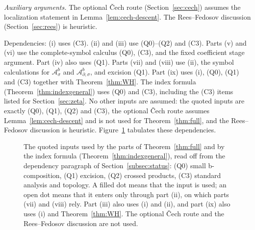 \documentclass[11pt,oneside,reqno]{article}
\newcommand{\Z}{\mathbb Z}
\newcommand{\Ib}{\mathcal I^b}
\newcommand{\Idb}{\mathcal I^b_\partial}
\newcommand{\Isb}{\mathcal I^b_\sigma}
\newcommand{\Ab}{\mathcal A^b}
\newcommand{\Asb}{\mathcal A^b_\sigma}
\newcommand{\Adb}{\mathcal A^b_\partial}
\newcommand{\Adsb}{\mathcal A^b_{\partial,\sigma}}
\theoremstyle{plain}
\theoremstyle{definition}
\theoremstyle{remark}
\begin{document}
\emph{Auxiliary arguments.} The optional \v Cech route
(Section~\ref{sec:cech}) assumes the localization statement in
Lemma~\ref{lem:cech-descent}. The Rees--Fedosov discussion
(Section~\ref{sec:rees}) is heuristic.

Dependencies: (i) uses (C3). (ii) and (iii) use (Q0)--(Q2) and (C3).
Parts (v) and (vi) use the complete-symbol calculus (Q0), (C3), and
the fixed coefficient stage argument. Part (iv) also uses (Q1).
Parts (vii) and (viii) use (ii), the symbol calculations for
\(\Asb\) and \(\Adsb\), and excision (Q1).
Part (ix) uses (i), (Q0), (Q1) and (C3) together with
Theorem~\ref{thm:WH}. The index formula
(Theorem~\ref{thm:indexgeneral}) uses (Q0) and (C3), including the (C3)
items listed for Section~\ref{sec:zeta}. No other inputs are assumed: the
quoted inputs are exactly (Q0), (Q1), (Q2) and (C3), the optional \v Cech
route assumes Lemma~\ref{lem:cech-descent} and is not used for
Theorem~\ref{thm:full}, and the Rees--Fedosov discussion is heuristic.
Figure~\ref{fig:inputs} tabulates these dependencies.

\begin{figure}[tbp]
\centering
{}
\caption[Quoted inputs used by each result]{The quoted inputs used by the
parts of Theorem~\ref{thm:full} and by the index formula
(Theorem~\ref{thm:indexgeneral}), read off from the dependency paragraph
of Section~\ref{subsec:status}: (Q0) small b-composition, (Q1) excision, (Q2) crossed products,
(C3) standard analysis and topology. A filled dot means that the input is
used; an open dot means that it
enters only through part (ii), on which parts (vii) and (viii) rely. Part
(iii) also uses (i) and (ii), and part (ix) also uses (i) and
Theorem~\ref{thm:WH}. The optional \v Cech route and the Rees--Fedosov
discussion are not used.}
\label{fig:inputs}
\end{figure}
\end{document}
